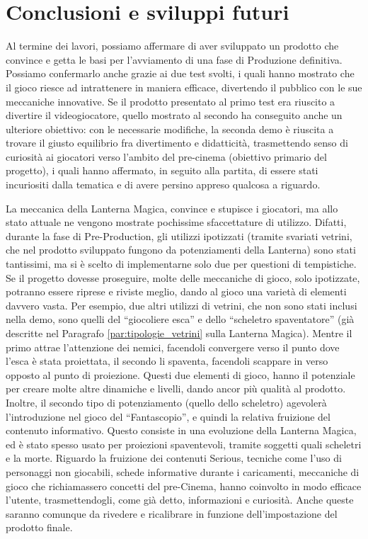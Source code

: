 \chapter{Conclusioni e sviluppi futuri}
\label{chap:risultati}

Al termine dei lavori, possiamo affermare di aver sviluppato un prodotto che convince e getta le basi per l'avviamento di una fase di Produzione definitiva. Possiamo confermarlo anche grazie ai due test svolti, i quali hanno mostrato che il gioco riesce ad intrattenere in maniera efficace, divertendo il pubblico con le sue meccaniche innovative. Se il prodotto presentato al primo test era riuscito a divertire il videogiocatore, quello mostrato al secondo ha conseguito anche un ulteriore obiettivo: con le necessarie modifiche, la seconda demo è riuscita a trovare il giusto equilibrio fra divertimento e didatticità, trasmettendo senso di curiosità ai giocatori verso l'ambito del pre-cinema (obiettivo primario del progetto), i quali hanno affermato, in seguito alla partita, di essere stati incuriositi dalla tematica e di avere persino appreso qualcosa a riguardo.

La meccanica della Lanterna Magica, convince e stupisce i giocatori, ma allo stato attuale ne vengono mostrate pochissime sfaccettature di utilizzo. Difatti, durante la fase di Pre-Production, gli utilizzi ipotizzati (tramite svariati vetrini, che nel prodotto sviluppato fungono da potenziamenti della Lanterna) sono stati tantissimi, ma si è scelto di implementarne solo due per questioni di tempistiche. Se il progetto dovesse proseguire, molte delle meccaniche di gioco, solo ipotizzate, potranno essere riprese e riviste meglio, dando al gioco una varietà di elementi davvero vasta. Per esempio, due altri utilizzi di vetrini, che non sono stati inclusi nella demo, sono quelli del ``giocoliere esca'' e dello ``scheletro spaventatore'' (già descritte nel Paragrafo \ref{par:tipologie_vetrini} sulla Lanterna Magica). Mentre il primo attrae l'attenzione dei nemici, facendoli convergere verso il punto dove l'esca è stata proiettata, il secondo li spaventa, facendoli scappare in verso opposto al punto di proiezione. Questi due elementi di gioco, hanno il potenziale per creare molte altre dinamiche e livelli, dando ancor più qualità al prodotto. Inoltre, il secondo tipo di potenziamento (quello dello scheletro) agevolerà l'introduzione nel gioco del ``Fantascopio'', e quindi la relativa fruizione del contenuto informativo. Questo consiste in una evoluzione della Lanterna Magica, ed è stato spesso usato per proiezioni spaventevoli, tramite soggetti quali scheletri e la morte.
Riguardo la fruizione dei contenuti Serious, tecniche come l'uso di personaggi non giocabili, schede informative durante i caricamenti, meccaniche di gioco che richiamassero concetti del pre-Cinema, hanno coinvolto in modo efficace l'utente, trasmettendogli, come già detto, informazioni e curiosità. Anche queste saranno comunque da rivedere e ricalibrare in funzione dell'impostazione del prodotto finale.

